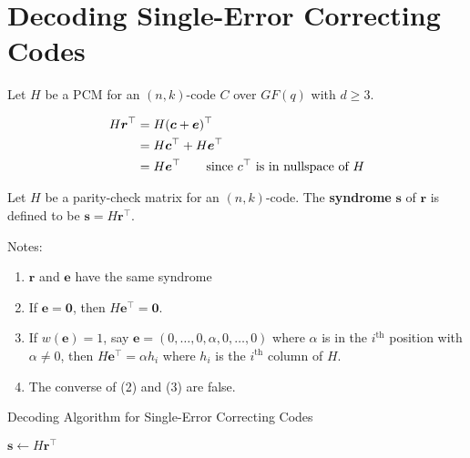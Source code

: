 \section{Decoding Single-Error Correcting Codes}
Let $ H $ be a PCM for an $ (n,k) $-code $ C $ over $ GF(q) $
with $ d\geqslant 3 $.

\begin{align*}
    H\bm{r}^\top
     & =H(\bm{c}+\bm{e})^\top                                           \\
     & =H\bm{c}^\top+H \bm{e}^\top                                      \\
     & =H\bm{e}^\top \qquad\text{since $ c^\top $ is in nullspace of }H
\end{align*}

\begin{defbox}
    \begin{definition}
        Let $ H $ be a parity-check matrix for an $ (n,k) $-code.
        The \textbf{syndrome} $ \bm{s} $ of $ \bm{r} $
        is defined to be $ \bm{s}=H\bm{r}^\top $.
    \end{definition}
\end{defbox}

Notes:
\begin{enumerate}[label=(\arabic*)]
    \item $ \bm{r} $ and $ \bm{e} $ have the same syndrome
    \item If $ \bm{e}=\bm{0} $, then $ H\bm{e}^\top=\bm{0} $.
    \item If $ w(\bm{e})=1 $, say $ \bm{e}=(0,\ldots,0,\alpha,0,\ldots,0) $
          where $ \alpha $ is in the $ i^{\text{th}} $ position with $ \alpha \neq 0 $,
          then $ H\bm{e}^\top=\alpha h_i $ where $ h_i $ is the $ i^{\text{th}} $
          column of $ H $.
    \item The converse of (2) and (3) are false.
\end{enumerate}

\begin{algbox}
    \begin{algorithm}[H]
        \DontPrintSemicolon{}
        \caption{Decoding Algorithm for Single-Error Correcting Codes}\label{alg:Decoding Algorithm for Single-Error Correcting Codes}

        $ \bm{s}\gets H\bm{r}^\top $\;
         {
        }
         {
             {
            }
        }
        \Return{}
    \end{algorithm}
\end{algbox}

